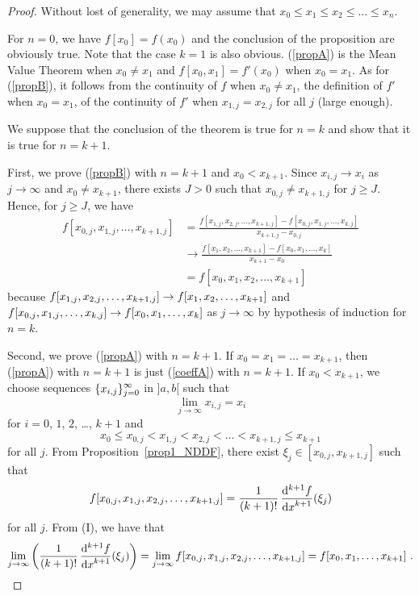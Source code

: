 \begin{proof}
Without lost of generality, we may assume that
$x_0\leq x_1 \leq x_2 \leq \ldots \leq x_n$.

For $n=0$, we have $f[x_0] = f(x_0)$ and the conclusion of the
proposition are obviously true.  Note that the case $k=1$ is also
obvious.  (\ref{propA}) is the Mean Value Theorem when $x_0 \neq x_1$
and $f[x_0,x_1] = f'(x_0)$ when $x_0 = x_1$.  As for
(\ref{propB}), it follows from the continuity of $f$ when
$x_0 \neq x_1$, the definition of $f'$ when $x_0 = x_1$, of the
continuity of $f'$ when $x_{1,j} = x_{2,j}$ for all $j$ (large enough).

We suppose that the conclusion of the theorem is true for $n=k$ and
show that it is true for $n=k+1$.

First, we prove (\ref{propB}) with $n=k+1$ and $x_0 < x_{k+1}$.  Since
$x_{i,j}\rightarrow x_i$ as $j\rightarrow \infty$ and
$x_0 \neq x_{k+1}$, there exists $J>0$ such that
$x_{0,j} \neq x_{k+1,j}$ for $j \geq J$.  Hence, for $j\geq J$, we have
\begin{align*}
f[x_{0,j}, x_{1,j},\ldots,x_{k+1,j}]
&=
\frac{f[x_{1,j},x_{2,j},\ldots,x_{k+1,j}] -
f[x_{0,j},x_{1,j},\ldots,x_{k,j}]}{x_{k+1,j} - x_{0,j}} \\
&\rightarrow 
\frac{f[x_1,x_2,\ldots,x_{k+1}] -
f[x_0,x_1,\ldots,x_k]}{x_{k+1} - x_0} \\
&= f[x_0,x_1,x_2, \ldots, x_{k+1}]
\end{align*}
because
$\displaystyle f[x_{1,j},x_{2,j},\ldots,x_{k+1,j}] \rightarrow
f[x_1,x_2,\ldots,x_{k+1}]$ and \\
$\displaystyle f[x_{0,j},x_{1,j},\ldots,x_{k,j}] \rightarrow
f[x_0,x_1,\ldots,x_k]$
as $j\rightarrow \infty$ by hypothesis of induction for $n=k$.

Second, we prove (\ref{propA}) with $n=k+1$.  If
$x_0=x_1=\ldots=x_{k+1}$, then (\ref{propA}) with $n=k+1$ is just
(\ref{coeffA}) with $n=k+1$.  If $x_0 < x_{k+1}$, we choose sequences
$\displaystyle \{x_{i,j}\}_{j=0}^\infty$ in $]a,b[$ such that
\[
\lim_{j\rightarrow \infty} x_{i,j} = x_i
\]
for $i=0$, $1$, $2$, \ldots, $k+1$ and
\[
x_0 \leq x_{0,j} < x_{1,j} < x_{2,j} < \ldots < x_{k+1,j} \leq x_{k+1}
\]
for all $j$.  From Proposition~\ref{prop1_NDDF}, there exist
$\xi_j \in [x_{0,j}, x_{k+1,j}]$ such that
\[
f[x_{0,j},x_{1,j},x_{2,j}, \ldots, x_{k+1,j}] =
\frac{1}{(k+1)!}\,\displaystyle \frac{\mathrm{d}^{k+1}{f}} {\displaystyle \mathrm{d}{x}^{k+1}}(\xi_j) 
\]
for all $j$.  From (I), we have that
\[
\lim_{j\rightarrow \infty}
\left( \frac{1}{(k+1)!}\,\displaystyle \frac{\mathrm{d}^{k+1}{f}} {\displaystyle \mathrm{d}{x}^{k+1}}(\xi_j) \right)
= \lim_{j\rightarrow \infty} f[x_{0,j}, x_{1,j}, x_{2,j}, \ldots, x_{k+1,j}]
= f[x_0,x_1, \ldots, x_{k+1}] \ . 
\]


\end{proof}

